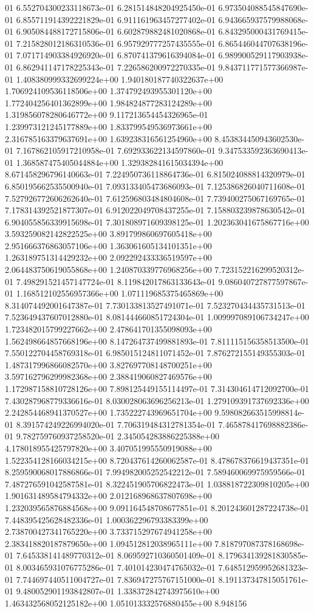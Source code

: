 01	6.552704300233118673e-01	6.281514848204925450e-01	6.973504088545847690e-01	6.855711914392221829e-01	6.911161963457277402e-01	6.943665937579988068e-01	6.905084488172715806e-01	6.602879882481020868e-01	6.843295000431769415e-01	7.215828012186310536e-01	6.957929777257435555e-01	6.865446044707638196e-01	7.071714903384926920e-01	6.870741379616394084e-01	6.989900529117903938e-01	6.862941147178225343e-01	7.226586200972270335e-01	9.843711771577366987e-01	1.408380999332699224e+00	1.940180187740322637e+00	1.706924109536118506e+00	1.374792493955301120e+00	1.772404256401362899e+00	1.984824877283124289e+00	1.319856078280646772e+00	9.117213654454326965e-01	1.239973121245177889e+00	1.833799549536973661e+00	2.316785163379637691e+00	1.639238316561254960e+00	8.453834450943602530e-01	7.167862105917210958e-01	7.692933622134597860e-01	9.347533592363690413e-01	1.368587475405044884e+00	1.329382841615034394e+00	8.671458296796140663e-01	7.224950736118864736e-01	6.815024088814320979e-01	6.850195662535500940e-01	7.093133405473686093e-01	7.125386826040711608e-01	7.527926772606262640e-01	7.612596803484804608e-01	7.739400275067169765e-01	7.178314392521877307e-01	6.912022049708437255e-01	7.158803239878630542e-01	6.904055856339915698e-01	7.301808971609398125e-01	1.202363041675867716e+00	3.593259082142822525e+00	3.891799860697605418e+00	2.951666376863057106e+00	1.363061605134101351e+00	1.263189751314429232e+00	2.092292433336519597e+00	2.064483750619055868e+00	1.240870339776968256e+00	7.723152216299520312e-01	7.498291521457147724e-01	8.119842017863133643e-01	9.086040727877597867e-01	1.168512102556957366e+00	1.071119685375465869e+00	8.314074492001647387e-01	7.730133813527491071e-01	7.523270434435731513e-01	7.523649437607012880e-01	8.081444660851724304e-01	1.009997089106734247e+00	1.723482015799227662e+00	2.478641701355098093e+00	1.562498664857668196e+00	8.147264737499881893e-01	7.811115156358513500e-01	7.550122704458769318e-01	6.985015124811071452e-01	7.876272155149355303e-01	1.487317996866082570e+00	3.827697708148700251e+00	3.597162796299982368e+00	2.388419060827469576e+00	1.172987158810728126e+00	7.898125449155114497e-01	7.314304614712092700e-01	7.430287968779336616e-01	8.030028063696256213e-01	1.279109391737692336e+00	2.242854468941370527e+00	1.735222743969651704e+00	9.598082663515998814e-01	8.391574249226994020e-01	7.706319484312781354e-01	7.465878417698882386e-01	9.782759760937258520e-01	2.345054283886225388e+00	4.178018955425797820e+00	3.407051995550919088e+00	1.522354128166034215e+00	8.720437614260062587e-01	8.478678376619437351e-01	8.259590068017886866e-01	7.994982005252542212e-01	7.589460069975959566e-01	7.487276591042587581e-01	8.322451905706822473e-01	1.038818722309810205e+00	1.901631489584794332e+00	2.012168968637807698e+00	1.232039565876884568e+00	9.091164548708677851e-01	8.201243601287224738e-01	7.448395425628482336e-01	1.000362296793383399e+00	2.738700427341765220e+00	3.733715297674941258e+00	2.383418820187879650e+00	1.094512812038965111e+00	7.818797087378168698e-01	7.645338141489770312e-01	8.069592710360501409e-01	8.179634139281830585e-01	8.003465931076775286e-01	7.401014230474765032e-01	7.648512959952681323e-01	7.744697440511004727e-01	7.836947275767151000e-01	8.191137347815051761e-01	9.480052901193842807e-01	1.338372842743975610e+00	1.463432568052125182e+00	1.051013332576880455e+00	8.948156